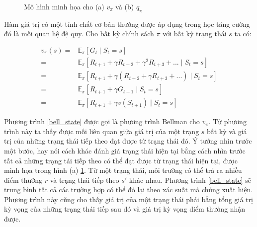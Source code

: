 \begin{figure}
		\caption[Mô hình minh họa cho hàm giá trị]{Mô hình minh họa cho (a) $v_{\pi}$ và (b) $q_{\pi}$}
		\label{backup_diagram}
	\end{figure}
	
	Hàm giá trị có một tính chất cơ bản thường được áp dụng trong học tăng cường đó là mối quan hệ đệ quy. Cho bất kỳ chính sách $\pi$ với bất kỳ trạng thái $s$ ta có:
	
	\begin{align}
		\label{bell_state}
			v_{\pi}(s) = {}& \mathbb{E}_{\pi}\left [\mathit{G}_t \mid \mathit{S}_{t} = s\right ] \nonumber \\
			= {}& \mathbb{E}_{\pi}\left [ \mathit{R}_{t+1} + \gamma \mathit{R}_{t+2} + \gamma^{2} \mathit{R}_{t+3} + ... \mid \mathit{S}_t = s  \right ] \nonumber \\
			= {}& \mathbb{E}_{\pi}\left [ \mathit{R}_{t+1} + \gamma( {R}_{t+2} + \gamma \mathit{R}_{t+3} + ...) \mid \mathit{S}_t = s  \right ] \nonumber \\
			= {}& \mathbb{E}_{\pi}\left [ \mathit{R}_{t+1} + \gamma\mathit{G}_{t + 1} \mid \mathit{S}_t = s  \right ] \nonumber \\
			= {}& \mathbb{E}_{\pi}\left [ \mathit{R}_{t+1} + \gamma v(\mathit{S}_{t+1}) \mid \mathit{S}_t = s  \right ]
	\end{align}
	
	Phương trình \ref{bell_state} được gọi là phương trình Bellman cho $v_{\pi}$. Từ phương trình này ta thấy được mối liên quan giữa giá trị của một trạng $s$ bất kỳ và giá trị của những trạng thái tiếp theo đạt được từ trạng thái đó. Ý tưởng nhìn trước một bước, hay nói cách khác đánh giá trạng thái hiện tại bằng cách nhìn trước tất cả những trạng tái tiếp theo có thể đạt được từ trạng thái hiện tại, được minh họa trong hình (a) \ref{backup_diagram}. Từ một trạng thái, môi trường có thể trả ra nhiều điểm thưởng $r$ và trạng thái tiếp theo $s'$ khác nhau. Phương trình \ref{bell_state} sẽ trung bình tất cả các trường hợp có thể đó lại theo xác suất mà chúng xuất hiện. Phương trình này cũng cho thấy giá trị của một trạng thái phải bằng tổng giá trị kỳ vọng của những trạng thái tiếp sau đó và giá trị kỳ vọng điểm thưởng nhận được.
	
